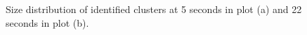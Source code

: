 \begingroup
\begin{figure}[!ht]
  \centering
\caption[Size distribution of identified clusters at 5 seconds and 22 seconds.]{Size distribution of identified clusters at 5 seconds in plot (a) and 22 seconds in plot (b).}
\label{Chap:Al/Vac:fig:size_distr}
\end{figure}
\endgroup


